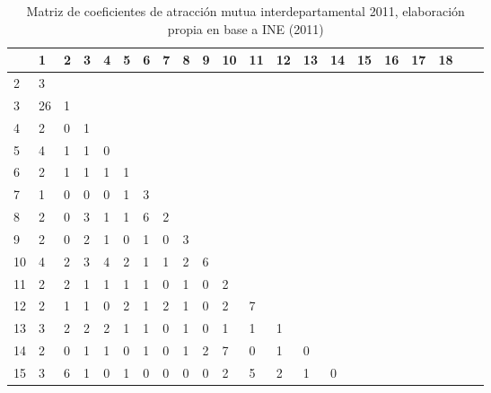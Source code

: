 \begin{table}
\centering
\caption{Matriz de coeficientes de atracción mutua interdepartamental 2011, elaboración propia en base a INE (2011)}
\begin{tabular}{lp{0.7cm}p{0.7cm}p{0.7cm}p{0.7cm}p{0.7cm}p{0.7cm}p{0.7cm}p{0.7cm}p{0.7cm}p{0.7cm}p{0.7cm}p{0.7cm}p{0.7cm}p{0.7cm}p{0.7cm}p{0.7cm}p{0.7cm}p{0.7cm}p{0.7cm}p{0.7cm}}
\toprule
{} &  1  &  2  &  3  &  4  &  5  &  6  &  7  &  8  &  9  &  10 &  11 &  12 &  13 &  14 &  15 &  16 &  17 &  18 \\
\midrule
2  &   3 &     &     &     &     &     &     &     &     &     &     &     &     &     &     &     &     &     \\
3  &  26 &   1 &     &     &     &     &     &     &     &     &     &     &     &     &     &     &     &     \\
4  &   2 &   0 &   1 &     &     &     &     &     &     &     &     &     &     &     &     &     &     &     \\
5  &   4 &   1 &   1 &   0 &     &     &     &     &     &     &     &     &     &     &     &     &     &     \\
6  &   2 &   1 &   1 &   1 &   1 &     &     &     &     &     &     &     &     &     &     &     &     &     \\
7  &   1 &   0 &   0 &   0 &   1 &   3 &     &     &     &     &     &     &     &     &     &     &     &     \\
8  &   2 &   0 &   3 &   1 &   1 &   6 &   2 &     &     &     &     &     &     &     &     &     &     &     \\
9  &   2 &   0 &   2 &   1 &   0 &   1 &   0 &   3 &     &     &     &     &     &     &     &     &     &     \\
10 &   4 &   2 &   3 &   4 &   2 &   1 &   1 &   2 &   6 &     &     &     &     &     &     &     &     &     \\
11 &   2 &   2 &   1 &   1 &   1 &   1 &   0 &   1 &   0 &   2 &     &     &     &     &     &     &     &     \\
12 &   2 &   1 &   1 &   0 &   2 &   1 &   2 &   1 &   0 &   2 &   7 &     &     &     &     &     &     &     \\
13 &   3 &   2 &   2 &   2 &   1 &   1 &   0 &   1 &   0 &   1 &   1 &   1 &     &     &     &     &     &     \\
14 &   2 &   0 &   1 &   1 &   0 &   1 &   0 &   1 &   2 &   7 &   0 &   1 &   0 &     &     &     &     &     \\
15 &   3 &   6 &   1 &   0 &   1 &   0 &   0 &   0 &   0 &   2 &   5 &   2 &   1 &   0 &     &     &     &     \\

\end{tabular}
\end{table}
